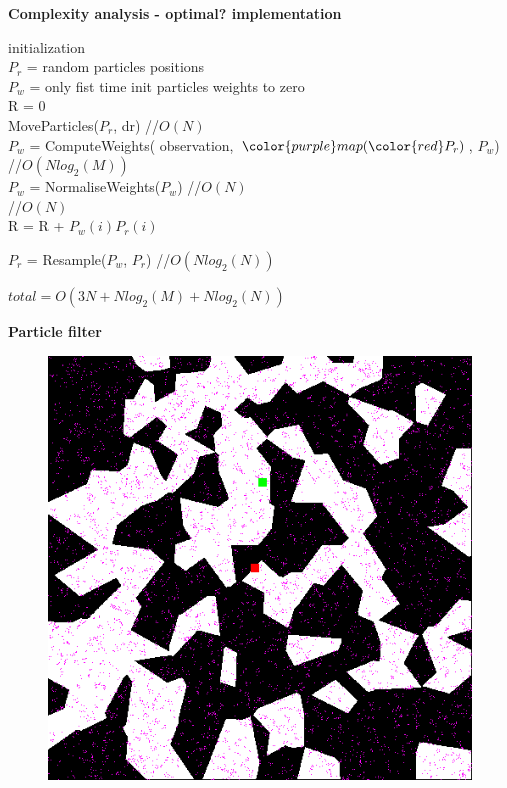 \documentclass[xcolor=dvipsnames]{beamer}
\begin{document}
\begin{frame}{\bf Complexity analysis - optimal? implementation}


\begin{algorithm}[H]
 initialization  \\
                 {\color{red}$P_r$} = random particles positions \\
                 {\color{blue}$P_w$} = only fist time init particles weights to zero \\
                  R = 0 \\
 MoveParticles({\color{red}$P_r$}, {\color{red}dr}) //{\color{red}\bf$O(N)$} \\
 {\color{blue}$P_w$} = ComputeWeights({\color{green} observation}, ${\color{purple}map}({\color{red}P_r})$, {\color{blue}$P_w$}) //{\color{red}\bf $O(Nlog_2(M))$}  \\
 {\color{blue}$P_w$} = NormaliseWeights({\color{blue}$P_w$}) //{\color{red}\bf$O(N)$} \\
 //{\color{red}\bf$O(N)$} \\
 {
  R = R + {\color{blue}$P_w(i)$}{\color{red}$P_r(i)$}
 }

 {\color{red}$P_r$} = Resample({\color{blue}$P_w$}, {\color{red}$P_r$}) //{\color{red}\bf$O(Nlog_2(N))$}


\end{algorithm}
\bigskip
$total = O(3N + Nlog_2(M) + Nlog_2(N))$


\end{frame}


\begin{frame}{\bf Particle filter}

\begin{figure}[htbp]
  \centering
   \includegraphics[scale=0.4]{../pictures/00000.png}
\end{figure}

\end{frame}
\end{document}
